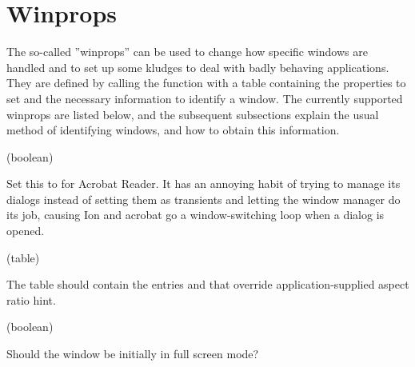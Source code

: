 \section{Winprops}
\label{sec:winprops}

The so-called ''winprops'' can be used to change how
specific windows are handled and to set up some kludges to deal with
badly behaving applications. They are defined by calling the function
 with a table containing the properties to set and the
necessary information to identify a window. The currently supported
winprops are listed below, and the subsequent subsections explain the
usual method of identifying windows, and how to obtain this information.


\newenvironment{winprop}[2]{
  \begin{function}%
      \item[Winprop:] \var{#1} (#2)
      \item[Description:]
}
{
  \end{function}
}


\begin{winprop}{acrobatic}{boolean}
    Set this to  for Acrobat Reader. It has an annoying
    habit of trying to manage its dialogs instead of setting them as
    transients and letting the window manager do its job, causing
    Ion and acrobat go a window-switching loop when a dialog is
    opened. 
\end{winprop}


\begin{winprop}{aspect}{table}
    The table should contain the entries  and  that
    override application-supplied aspect ratio hint.
\end{winprop}


\begin{winprop}{fullscreen}{boolean}
    Should the window be initially in full screen mode?
\end{winprop}


